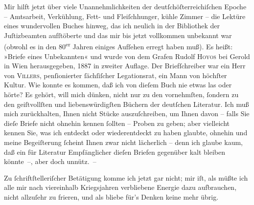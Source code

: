 \pstart
           Mir hilft jetzt über viele Unannehmlichkeiten der deutſchöſterreichiſchen Epoche – Amtsarbeit, Verkühlung, Fett- und
               Fleiſchhunger, kühle Zimmer – die Lektüre eines wundervollen Buches hinweg, das ich
               neulich in der Bibliothek der Juſtizbeamten
               aufſtöberte und das mir bis jetzt vollkommen unbekannt war (obwohl es in den
                     80\textsuperscript{er} Jahren einiges Aufſehen erregt
               haben muß). Es heißt: »Briefe eines Unbekannten«
               und wurde von dem Grafen Rudolf \textsc{Hoyos} bei Gerold in Wien herausgegeben, 1887 in zweiter Auflage. Der Briefſchreiber
               war ein Herr von \textsc{Villers}, penſionierter ſächſiſcher Legationsrat,
               ein Mann von höchſter Kultur. Wie konnte es kommen, daß ich von dieſem Buch nie etwas
               las oder hörte? Es gehört, will mich dünken, nicht nur zu den vornehmſten,{ }ſondern zu
               den geiſtvollſten und liebenswürdigſten Büchern der deutſchen {\pb}Literatur. Ich muß mich zurückhalten,
               Ihnen nicht Stücke auszuſchreiben, um Ihnen davon – falls Sie dieſe Briefe nicht
               ohnehin kennen{ }ſollten – Proben zu geben; aber vielleicht kennen Sie, was ich
               entdeckt oder wiederentdeckt zu haben glaubte, ohnehin und meine Begeiſterung{ }ſcheint
               Ihnen zwar nicht lächerlich – denn ich glaube kaum, daß ein für Literatur
               Empfänglicher dieſen Briefen gegenüber kalt bleiben könnte –, aber doch unnütz. –\pend
           
\pstart
           Zu{ }ſchriftſtelleriſcher Betätigung komme ich jetzt gar nicht; mir iſt, als müßte ich
               alle mir nach viereinhalb Kriegsjahren verbliebene Energie dazu aufbrauchen, nicht
               allzuſehr zu frieren, und als bliebe für’s Denken keine mehr übrig.\pend
           
